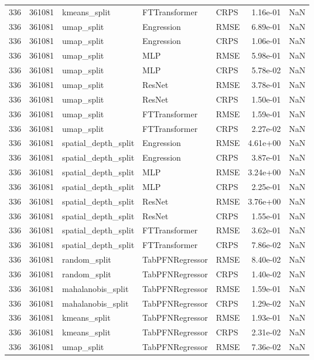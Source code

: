 \begin{tabular}{rrlllrr}
336 & 361081 & kmeans\_split & FTTransformer & CRPS & 1.16e-01 & NaN \\
336 & 361081 & umap\_split & Engression & RMSE & 6.89e-01 & NaN \\
336 & 361081 & umap\_split & Engression & CRPS & 1.06e-01 & NaN \\
336 & 361081 & umap\_split & MLP & RMSE & 5.98e-01 & NaN \\
336 & 361081 & umap\_split & MLP & CRPS & 5.78e-02 & NaN \\
336 & 361081 & umap\_split & ResNet & RMSE & 3.78e-01 & NaN \\
336 & 361081 & umap\_split & ResNet & CRPS & 1.50e-01 & NaN \\
336 & 361081 & umap\_split & FTTransformer & RMSE & 1.59e-01 & NaN \\
336 & 361081 & umap\_split & FTTransformer & CRPS & 2.27e-02 & NaN \\
336 & 361081 & spatial\_depth\_split & Engression & RMSE & 4.61e+00 & NaN \\
336 & 361081 & spatial\_depth\_split & Engression & CRPS & 3.87e-01 & NaN \\
336 & 361081 & spatial\_depth\_split & MLP & RMSE & 3.24e+00 & NaN \\
336 & 361081 & spatial\_depth\_split & MLP & CRPS & 2.25e-01 & NaN \\
336 & 361081 & spatial\_depth\_split & ResNet & RMSE & 3.76e+00 & NaN \\
336 & 361081 & spatial\_depth\_split & ResNet & CRPS & 1.55e-01 & NaN \\
336 & 361081 & spatial\_depth\_split & FTTransformer & RMSE & 3.62e-01 & NaN \\
336 & 361081 & spatial\_depth\_split & FTTransformer & CRPS & 7.86e-02 & NaN \\
336 & 361081 & random\_split & TabPFNRegressor & RMSE & 8.40e-02 & NaN \\
336 & 361081 & random\_split & TabPFNRegressor & CRPS & 1.40e-02 & NaN \\
336 & 361081 & mahalanobis\_split & TabPFNRegressor & RMSE & 1.59e-01 & NaN \\
336 & 361081 & mahalanobis\_split & TabPFNRegressor & CRPS & 1.29e-02 & NaN \\
336 & 361081 & kmeans\_split & TabPFNRegressor & RMSE & 1.93e-01 & NaN \\
336 & 361081 & kmeans\_split & TabPFNRegressor & CRPS & 2.31e-02 & NaN \\
336 & 361081 & umap\_split & TabPFNRegressor & RMSE & 7.36e-02 & NaN \\

\end{tabular}
